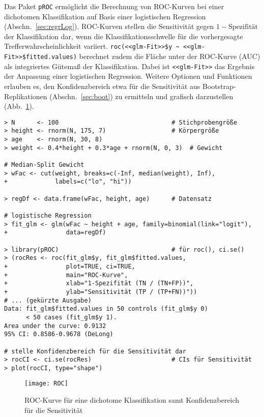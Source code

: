 Das Paket \lstinline!pROC! \cite{Robin2011} ermöglicht die Berechnung von ROC-Kurven bei einer dichotomen Klassifikation auf Basis einer logistischen Regression (Abschn.\ \ref{sec:regrLog}). ROC-Kurven stellen die Sensitivität gegen $1 - \text{Spezifität}$ der Klassifikation dar, wenn die Klassifikationsschwelle für die vorhergesagte Trefferwahrscheinlichkeit variiert. \lstinline!roc(<<glm-Fit>>$y ~ <<glm-Fit>>$fitted.values)! berechnet zudem die Fläche unter der ROC-Kurve (AUC) als integriertes Gütemaß der Klassifikation. Dabei ist \lstinline!<<glm-Fit>>! das Ergebnis der Anpassung einer logistischen Regression. Weitere Optionen und Funktionen erlauben es, den Konfidenzbereich etwa für die Sensitivität aus Bootstrap-Replikationen (Abschn.\ \ref{sec:boot}) zu ermitteln und grafisch darzustellen (Abb.\ \ref{fig:ROC}).
\begin{lstlisting}
> N      <- 100                               # Stichprobengröße
> height <- rnorm(N, 175, 7)                  # Körpergröße
> age    <- rnorm(N, 30, 8)
> weight <- 0.4*height + 0.3*age + rnorm(N, 0, 3)  # Gewicht

# Median-Split Gewicht
> wFac <- cut(weight, breaks=c(-Inf, median(weight), Inf),
+             labels=c("lo", "hi"))

> regDf <- data.frame(wFac, height, age)      # Datensatz

# logistische Regression
> fit_glm <- glm(wFac ~ height + age, family=binomial(link="logit"),
+                data=regDf)

> library(pROC)                               # für roc(), ci.se()
> (rocRes <- roc(fit_glm$y, fit_glm$fitted.values,
+                plot=TRUE, ci=TRUE,
+                main="ROC-Kurve",
+                xlab="1-Spezifität (TN / (TN+FP))",
+                ylab="Sensitivität (TP / (TP+FN))"))
# ... (gekürzte Ausgabe)
Data: fit_glm$fitted.values in 50 controls (fit_glm$y 0)
      < 50 cases (fit_glm$y 1).
Area under the curve: 0.9132
95% CI: 0.8586-0.9678 (DeLong)

# stelle Konfidenzbereich für die Sensitivität dar
> rocCI <- ci.se(rocRes)                      # CIs für Sensitivität
> plot(rocCI, type="shape")
\end{lstlisting}

\begin{figure}[ht]
\centering
\texttt{[image: ROC]}
\vspace*{-0.5em}
\caption{ROC-Kurve für eine dichotome Klassifikation samt Konfidenzbereich für die Sensitivität}
\label{fig:ROC}
\end{figure}

